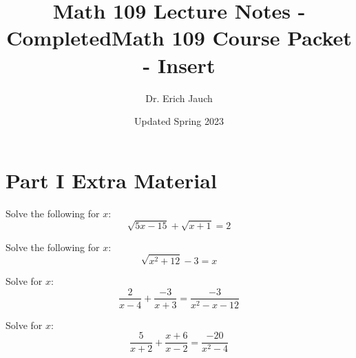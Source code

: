 \documentclass[12pt]{exam}
\title{Math 109 Lecture Notes - Completed}
\title{Math 109 Course Packet - Insert}
\author{Dr. Erich Jauch}
\date{Updated Spring 2023}
\begin{document}
\pagestyle{headandfoot}
\renewcommand\thesection{\fnsymbol{section}}
\section{Part I Extra Material}
\begin{exercise}
Solve the following for $x$:
\[
\sqrt{5x-15}+\sqrt{x+1}=2
\]
\end{exercise}
\begin{solution}[3in]

\end{solution}

\begin{exercise}
Solve the following for $x$:
\[
\sqrt{x^2+12}-3=x
\]
\end{exercise}

\newpage

\begin{exercise}
Solve for $x$:
\[
\frac{2}{x-4}+\frac{-3}{x+3}=\frac{-3}{x^2-x-12}
\]
\end{exercise}
\begin{solution}[3in]

\end{solution}

\begin{exercise}
Solve for $x$:
\[
\frac{5}{x+2}+\frac{x+6}{x-2}=\frac{-20}{x^2-4}
\]
\end{exercise}
\end{document}
